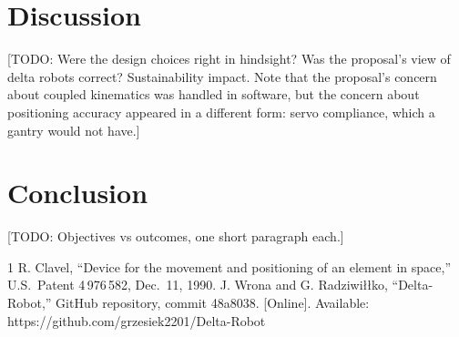 \documentclass[conference]{IEEEtran}
\begin{document}
\section{Discussion}
[TODO: Were the design choices right in hindsight? Was the proposal's view of delta
robots correct? Sustainability impact. Note that the proposal's concern about coupled
kinematics was handled in software, but the concern about positioning accuracy
appeared in a different form: servo compliance, which a gantry would not have.]

\section{Conclusion}
[TODO: Objectives vs outcomes, one short paragraph each.]

\begin{thebibliography}{1}
 R. Clavel, ``Device for the movement and positioning of an element in space,'' U.S.\ Patent 4\,976\,582, Dec.\ 11, 1990.
 J. Wrona and G. Radziwi\l{}\l{}ko, ``Delta-Robot,'' GitHub repository, commit 48a8038. [Online]. Available: https://github.com/grzesiek2201/Delta-Robot
\end{thebibliography}
\end{document}
